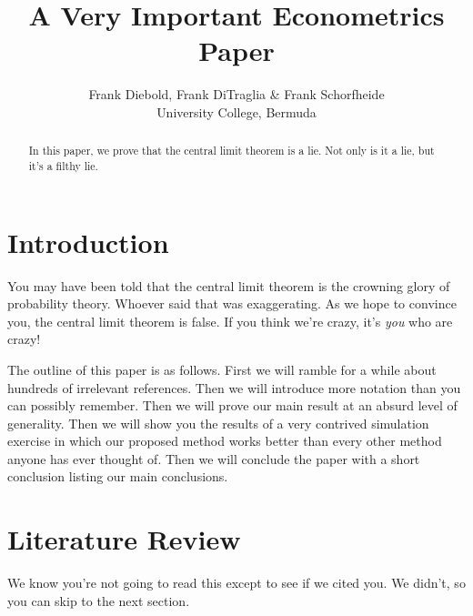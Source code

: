 \documentclass[12pt,letterpaper]{article}
\title{A Very Important Econometrics Paper}
\author{Frank Diebold, Frank DiTraglia \& Frank Schorfheide \\ University College, Bermuda}
\begin{document}
\maketitle

\begin{abstract}
	In this paper, we prove that the central limit theorem is a lie. 
	Not only is it a lie, but it's a filthy lie.
\end{abstract}

\section{Introduction}
You may have been told that the central limit theorem is the crowning glory of probability theory.
Whoever said that was exaggerating.
As we hope to convince you, the central limit theorem is false.
If you think we're crazy, it's \emph{you} who are crazy!

The outline of this paper is as follows.
First we will ramble for a while about hundreds of irrelevant references.
Then we will introduce more notation than you can possibly remember.
Then we will prove our main result at an absurd level of generality.
Then we will show you the results of a very contrived simulation exercise in which our proposed method works better than every other method anyone has ever thought of.
Then we will conclude the paper with a short conclusion listing our main conclusions.

\section{Literature Review}
We know you're not going to read this except to see if we cited you.
We didn't, so you can skip to the next section.
\end{document}
